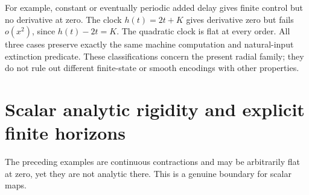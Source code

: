 \documentclass[11pt,letterpaper]{article}
\numberwithin{equation}{section}
\theoremstyle{definition}
\theoremstyle{remark}
\newcommand{\srcmark}[1]{\par\noindent{\small\itshape [source~#1]}\par}
\begin{document}
For example, constant or eventually periodic added delay gives finite
control but no derivative at zero. The clock $h(t)=2t+K$ gives derivative
zero but fails $o(x^2)$, since $h(t)-2t=K$. The quadratic clock is flat at
every order. All three cases preserve exactly the same machine computation
and natural-input extinction predicate. These classifications concern the
present radial family; they do not rule out different finite-state or
smooth encodings with other properties.

\section{Scalar analytic rigidity and explicit finite horizons}\label{pqc:ad:sec:analytic}
\srcmark{12}

The preceding examples are continuous contractions and may be arbitrarily
flat at zero, yet they are not analytic there. This is a genuine boundary
for scalar maps.
\end{document}
